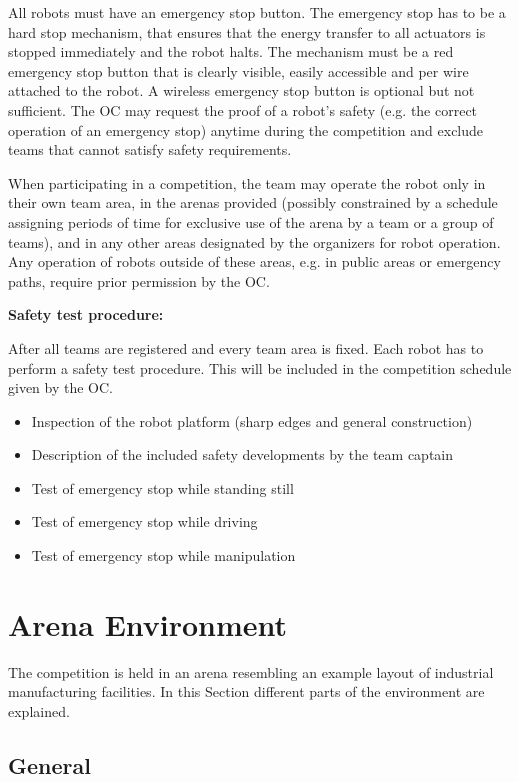 All robots must have an emergency stop button. The emergency stop has to be a hard stop mechanism, that ensures that the energy transfer to all actuators is stopped immediately and the robot halts. The mechanism must be a red emergency stop button that is clearly visible, easily accessible and per wire attached to the robot. A wireless emergency stop button is optional but not sufficient.
The OC may request the proof of a robot's safety (e.g. the correct operation of an emergency stop) anytime during the competition and exclude teams that cannot satisfy safety requirements.

When participating in a competition, the team may operate the robot only in their own team area, in the arenas provided (possibly constrained by a schedule assigning periods of time for exclusive use of the arena by a team or a group of teams), and in any other areas designated by the organizers for robot operation. Any operation of robots outside of these areas, e.g. in public areas or emergency paths, require prior permission by the OC.

\textbf{Safety test procedure:}

After all teams are registered and every team area is fixed. Each robot has to perform a safety test procedure. This will be included in the competition schedule given by the OC.
\begin{itemize}
	\item Inspection of the robot platform (sharp edges and general construction)
	\item Description of the included safety developments by the team captain 
	\item Test of emergency stop while standing still
	\item Test of emergency stop while driving 
	\item Test of emergency stop while manipulation
\end{itemize}

\clearpage

\section{Arena Environment}
\label{sec:ArenaDesign}
The competition is held in an arena resembling an example layout of industrial manufacturing facilities. In this Section different parts of the environment are explained.
\subsection{General}
\label{ssec:ArenaGeneral}


